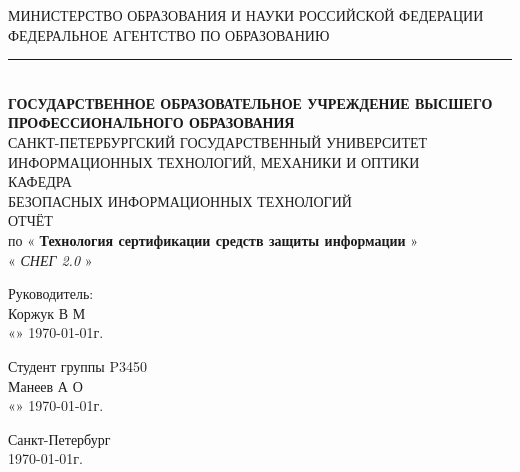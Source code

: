 \begin{titlepage}
	\newpage

	\begin{center}
		\newlength{\HeadLength}
		\settowidth{\HeadLength}{МИНИСТЕРСТВО ОБРАЗОВАНИЯ И НАУКИ РОССИЙСКОЙ ФЕДЕРАЦИИ}
		МИНИСТЕРСТВО ОБРАЗОВАНИЯ И НАУКИ РОССИЙСКОЙ ФЕДЕРАЦИИ\\
		ФЕДЕРАЛЬНОЕ АГЕНТСТВО ПО ОБРАЗОВАНИЮ\\
		\rule{\HeadLength}{0.4mm}\\
		\vspace{1.0cm}
		{\fontsize{8pt}{10}
			\selectfont \textbf{ГОСУДАРСТВЕННОЕ ОБРАЗОВАТЕЛЬНОЕ УЧРЕЖДЕНИЕ ВЫСШЕГО ПРОФЕССИОНАЛЬНОГО ОБРАЗОВАНИЯ}\\
		}
		\vspace{1.0cm}
		САНКТ-ПЕТЕРБУРГСКИЙ ГОСУДАРСТВЕННЫЙ УНИВЕРСИТЕТ\\
		ИНФОРМАЦИОННЫХ ТЕХНОЛОГИЙ, МЕХАНИКИ И ОПТИКИ\\
		\vspace{1.5cm}
		КАФЕДРА\\
		БЕЗОПАСНЫХ ИНФОРМАЦИОННЫХ ТЕХНОЛОГИЙ\\
		\vspace{2.5cm}
		\Large{ОТЧЁТ}\\
		по
		«
		\textbf{
		Технология сертификации средств защиты информации
		}
		»\\
		\vspace{1.0cm}
		«
		\textsc{\textit{
		СНЕГ 2.0
		}}
		»\\
	\end{center}

	\vspace{\fill}

	\newlength{\ML}

	\hfill\begin{minipage}{0.45\textwidth}
	Руководитель:\\
	\underline{\hspace{\ML}}
		Коржук В М
	\\
	«\underline{\hspace{0.7cm}}» \underline{\hspace{2cm}} \CurrentYear\today г.
	\end{minipage}%
	\bigskip

	\hfill\begin{minipage}{0.45\textwidth}
	Студент группы 
		P3450
	\\
	\underline{\hspace{\ML}}
		Манеев А О
	\\
	«\underline{\hspace{0.7cm}}» \underline{\hspace{2cm}} \CurrentYear\today г.
	\end{minipage}%

	\vspace{2.5cm}

	\begin{center}
	Санкт-Петербург\\
	\CurrentYear\today г.
	\end{center}
	\newpage

\end{titlepage}
